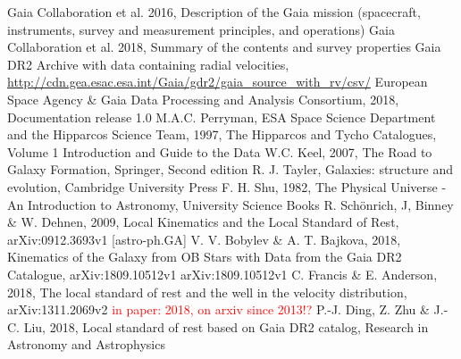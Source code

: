 \documentclass{aastex62}
\begin{document}
	\begin{thebibliography}{}
		
		 Gaia Collaboration et al. 2016, Description of the Gaia mission (spacecraft, instruments, survey and measurement principles, and operations)
		Gaia Collaboration et al. 2018, Summary of the contents and survey properties
		 Gaia DR2 Archive with data containing radial velocities, \url{http://cdn.gea.esac.esa.int/Gaia/gdr2/gaia_source_with_rv/csv/}
		 European Space Agency \& Gaia Data Processing and Analysis Consortium, 2018, Documentation release 1.0
		 M.A.C. Perryman, ESA Space Science Department and the Hipparcos Science Team, 1997, The Hipparcos and Tycho Catalogues, Volume 1 Introduction and Guide to the Data
		W.C. Keel, 2007, The Road to Galaxy Formation, Springer, Second edition
		 R. J. Tayler, Galaxies: structure and evolution, Cambridge University Press
		 F. H. Shu, 1982, The Physical Universe - An Introduction to Astronomy, University Science Books
		 R. Sch\"{o}nrich, J, Binney \& W. Dehnen, 2009, Local Kinematics and the Local Standard of Rest, arXiv:0912.3693v1 [astro-ph.GA]
		 V. V. Bobylev \& A. T. Bajkova, 2018, Kinematics of the Galaxy from OB Stars with Data from the Gaia DR2 Catalogue, arXiv:1809.10512v1 arXiv:1809.10512v1
		 C. Francis \& E. Anderson, 2018, The local standard of rest and the well in the velocity distribution, arXiv:1311.2069v2 \textcolor{red}{in paper: 2018, on arxiv since 2013!?}
		 P.-J. Ding, Z. Zhu \& J.-C. Liu, 2018, Local standard of rest based on Gaia DR2 catalog, Research in Astronomy and Astrophysics
		
	\end{thebibliography}
	
\end{document}
